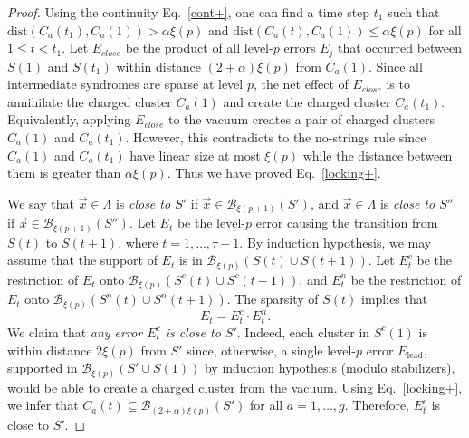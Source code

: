 \begin{proof}
Using the continuity Eq.~\eqref{cont+},
one can find a time step $t_1$
such that $\mathrm{dist}(C_a(t_1), C_a(1))>\alpha \xi(p)$ and
$\mathrm{dist}(C_a(t), C_a(1)) \le \alpha \xi(p)$ for all $1\le t<t_1$.
Let $E_{close}$ be the product of all level-$p$ errors $E_j$
that occurred between $S(1)$ and $S(t_1)$ within distance $(2+\alpha)\xi(p)$
from $C_a(1)$. Since all intermediate syndromes are sparse at level $p$,
the net effect of $E_{close}$ is to annihilate the  charged cluster  $C_a(1)$
and create the charged cluster $C_a(t_1)$.
Equivalently, applying $E_{close}$ to the vacuum creates a pair of charged clusters
$C_a(1)$ and $C_a(t_1)$.
However, this contradicts to the no-strings rule since
$C_a(1)$ and $C_a(t_1)$ have linear size at most $\xi(p)$ while
the distance between them is greater than $\alpha \xi(p)$.
Thus we have proved Eq.~\eqref{locking+}.

We say that $\vec{x}\in \Lambda$ is {\em close to $S'$} if $\vec{x}\in \mathcal B_{\xi(p+1)}(S')$,
and $\vec{x}\in \Lambda$ is {\em close to $S''$} if $\vec{x}\in \mathcal B_{\xi(p+1)}(S'')$.
%
Let $E_t$ be the level-$p$ error causing the transition from  $S(t)$ to $S(t+1)$,
where $t=1,\ldots,\tau-1$.
By induction hypothesis, we may assume that the support of $E_t$ is in $\mathcal B_{\xi(p)}(S(t) \cup S(t+1))$.
Let $E^c_t$ be the restriction of $E_t$ onto $\mathcal B_{\xi(p)}(S^c(t)\cup S^c(t+1))$,
and $E^n_t$ be the restriction of $E_t$ onto $\mathcal B_{\xi(p)}(S^n(t)\cup S^n(t+1))$.
The sparsity of $S(t)$ implies that
\begin{equation}
\label{EcEn+}
E_t = E^c_t \cdot E^n_t.
\end{equation}
We claim that {\em any error $E^c_t$ is close to $S'$}.
Indeed, each cluster in $S^c(1)$ is within distance $2\xi(p)$ from $S'$ 
since, otherwise, a single level-$p$ error $E_\text{lead}$,
supported in $\mathcal B_{\xi(p)}(S' \cup S(1) )$ by induction hypothesis (modulo stabilizers),
would be able to create a charged cluster from the vacuum.
Using Eq.~\eqref{locking+}, we infer that 
$C_a(t) \subseteq \mathcal B_{(2+\alpha)\xi(p)}(S')$ for all $a=1,\ldots,g$.
Therefore, $E^c_t$ is close to $S'$.



\end{proof}
